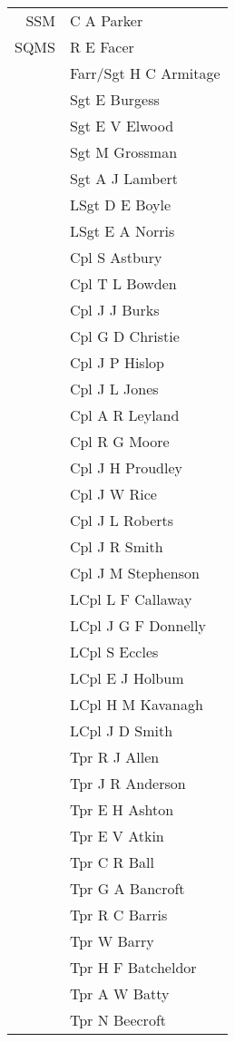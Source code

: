 \begin{center}
  \begin{tabular}{rl}
    SSM & C A Parker \\
    SQMS & R E Facer \\
    & Farr/Sgt H C Armitage \\
    & Sgt E Burgess \\
    & Sgt E V Elwood \\
    & Sgt M Grossman \\
    & Sgt A J Lambert \\
    & LSgt D E Boyle \\
    & LSgt E A Norris \\
    & Cpl S Astbury \\
    & Cpl T L Bowden \\
    & Cpl J J Burks \\
    & Cpl G D Christie \\
    & Cpl J P Hislop \\
    & Cpl J L Jones \\
    & Cpl A R Leyland \\
    & Cpl R G Moore \\
    & Cpl J H Proudley \\
    & Cpl J W Rice \\
    & Cpl J L Roberts \\
    & Cpl J R Smith \\
    & Cpl J M Stephenson \\
    & LCpl L F Callaway \\
    & LCpl J G F Donnelly \\
    & LCpl S Eccles \\
    & LCpl E J Holbum \\
    & LCpl H M Kavanagh \\
    & LCpl J D Smith \\
    & Tpr R J Allen \\
    & Tpr J R Anderson \\
    & Tpr E H Ashton \\
    & Tpr E V Atkin \\
    & Tpr C R Ball \\
    & Tpr G A Bancroft \\
    & Tpr R C Barris \\
    & Tpr W Barry \\
    & Tpr H F Batcheldor \\
    & Tpr A W Batty \\
    & Tpr N Beecroft \\

\end{tabular}
\end{center}

